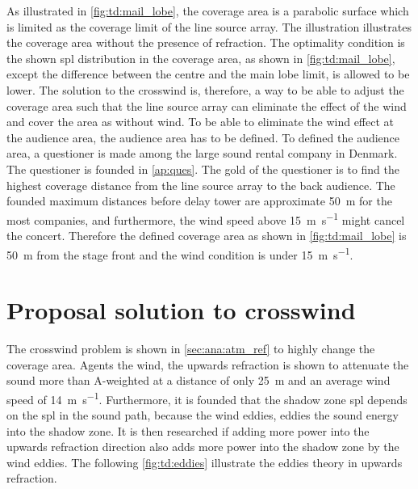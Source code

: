 As illustrated in \autoref{fig:td:mail_lobe}, the coverage area is a parabolic surface which is limited as the  coverage limit of the line source array. The illustration illustrates the coverage area without the presence of refraction. The optimality condition is the shown \gls{spl} distribution in the coverage area, as shown in \autoref{fig:td:mail_lobe}, except the difference between the centre and the main lobe limit, is allowed to be lower. The solution to the crosswind is, therefore, a way to be able to adjust the coverage area such that the line source array can eliminate the effect of the wind and cover the area as without wind. To be able to eliminate the wind effect at the audience area, the audience area has to be defined. To defined the audience area, a questioner is made among the large sound rental company in Denmark. The questioner is founded in \autoref{ap:ques}. The gold of the questioner is to find the highest coverage distance from the line source array to the back audience. The founded maximum distances before delay tower are approximate \SI{50}{\meter} for the most companies, and furthermore, the wind speed above \SI{15}{\meter\per\second} might cancel the concert. Therefore the defined coverage area as shown in \autoref{fig:td:mail_lobe} is \SI{50}{\meter} from the stage front and the wind condition is under \SI{15}{\meter\per\second}.



\section{Proposal solution to crosswind}\label{sec:des:pro_cross}
The crosswind problem is shown in \autoref{sec:ana:atm_ref} to highly change the coverage area. Agents the wind, the upwards refraction is shown to attenuate the sound more than  A-weighted at a distance of only \SI{25}{\meter} and an average wind speed of \SI{14}{\meter\per\second}. Furthermore, it is founded that the shadow zone \gls{spl} depends on the \gls{spl} in the sound path, because the wind eddies, eddies the sound energy into the shadow zone. It is then researched if adding more power into the upwards refraction direction also adds more power into the shadow zone by the wind eddies. The following \autoref{fig:td:eddies} illustrate the eddies theory in upwards refraction.


